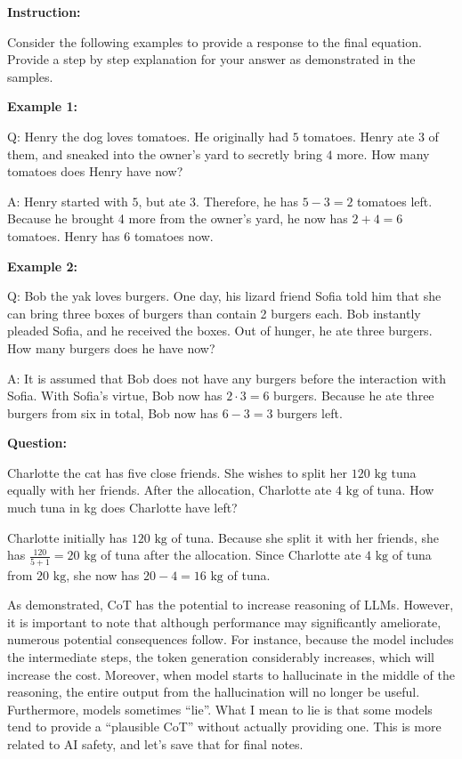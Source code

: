 \documentclass[../main.tex]{subfiles}
\begin{document}
\begin{example}
\textbf{Instruction:}

Consider the following examples to provide a response to the
final equation. Provide a step by step explanation for your
answer as demonstrated in the samples.

\textbf{Example 1:}

Q: Henry the dog loves tomatoes. He originally had $5$ tomatoes.
Henry ate $3$ of them, and sneaked into the owner's yard to
secretly bring $4$ more. How many tomatoes does Henry have now?

A: Henry started with $5$, but ate $3$. Therefore, he has
$5 - 3 = 2$ tomatoes left. Because he brought 4 more from the
owner's yard, he now has $2 + 4 = 6$ tomatoes. Henry has $6$
tomatoes now.

\textbf{Example 2:}

Q: Bob the yak loves burgers. One day, his lizard friend Sofia
told him that she can bring three boxes of burgers than contain
2 burgers each. Bob instantly pleaded Sofia, and he received the
boxes. Out of hunger, he ate three burgers. How many burgers
does he have now?

A: It is assumed that Bob does not have any burgers before the
interaction with Sofia. With Sofia's virtue, Bob now has
$2 \cdot 3 = 6$ burgers. Because he ate three burgers from
six in total, Bob now has $6 - 3 = 3$ burgers left.

\textbf{Question:}

Charlotte the cat has five close friends. She wishes to split
her $120 \text{ kg}$ tuna equally with her friends. After the
allocation, Charlotte ate $4 \text{ kg}$ of tuna. How much
tuna in kg does Charlotte have left?
\end{example}

\begin{example}
Charlotte initially has $120 \text{ kg}$ of tuna. Because she
split it with her friends, she has $\frac{120}{5 + 1} = 20
\text{ kg}$ of tuna after the allocation. Since Charlotte ate
$4 \text{ kg}$ of tuna from $20 \text{ kg}$, she now has
$20 - 4 = 16 \text{ kg}$ of tuna.
\end{example}

As demonstrated, CoT has the potential to increase reasoning
of LLMs. However, it is important to note that although performance
may significantly ameliorate, numerous potential consequences
follow. For instance, because the model includes the intermediate
steps, the token generation considerably increases, which will
increase the cost. Moreover, when model starts to hallucinate
in the middle of the reasoning, the entire output from the
hallucination will no longer be useful. Furthermore, models
sometimes ``lie''. What I mean to lie is that some models tend
to provide a ``plausible CoT'' without actually providing one.
This is more related to AI safety, and let's save that for final
notes.
\end{document}
